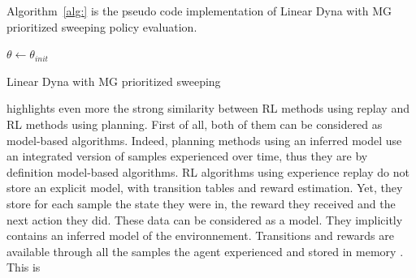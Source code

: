 \documentclass[]{article}
\begin{document}
Algorithm~\ref{alg:} is the pseudo code implementation of Linear Dyna with MG prioritized sweeping policy evaluation.

\begin{algorithm}[htbp]
  \DontPrintSemicolon
  \SetAlgoNoLine
  \(\theta \gets \theta_{init}\)\;
  \caption{Linear Dyna with MG prioritized sweeping \label{alg:canonical_dyna}}

\end{algorithm}

\textcite{vanseijen_deeper_2015} highlights even more the strong similarity between RL methods using replay and RL methods using planning. First of all, both of them can be considered as model-based algorithms. Indeed, planning methods using an inferred model use an integrated version of samples experienced over time, thus they are by definition model-based algorithms.
RL algorithms using experience replay do not store an explicit model, with transition tables and reward estimation. Yet, they store for each sample the state they were in, the reward they received and the next action they did. These data can be considered as a model. They implicitly contains an inferred model of the environnement. Transitions and rewards are available through all the samples the agent experienced and stored in memory \parencite{vanseijen_deeper_2015}. This is
\end{document}
